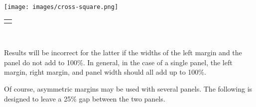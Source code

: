 \documentclass[10pt,]{article}
\theoremstyle{plain}
\theoremstyle{definition}
\theoremstyle{definition}
\theoremstyle{definition}
\theoremstyle{definition}
\theoremstyle{definition}
\theoremstyle{definition}
\numberwithin{equation}{section}
\newlength{\panelmax}
\begin{document}
{%
\setlength{\panelmax}{0pt}
\ifdefined\panelboxAimage\else\newsavebox{\panelboxAimage}\fi%
\begin{lrbox}{\panelboxAimage}
\texttt{[image: images/cross-square.png]}
\end{lrbox}
\ifdefined\phAimage\else\newlength{\phAimage}\fi%
\setlength{\phAimage}{\ht\panelboxAimage+\dp\panelboxAimage}
\settototalheight{\phAimage}{\usebox{\panelboxAimage}}
\setlength{\panelmax}{\maxof{\panelmax}{\phAimage}}
\leavevmode%
\setlength{\tabcolsep}{0\linewidth}
\par\medskip\noindent
\hspace*{0.9\linewidth}%
\begin{tabular}{@{}*{1}{c}@{}}
\begin{minipage}[c][\panelmax][t]{0.1\linewidth}\usebox{\panelboxAimage}\end{minipage}\end{tabular}\\
}%
\par
\hypertarget{p-661}{}%
Results will be incorrect for the latter if the widths of the left margin and the panel do not add to 100\%.  In general, in the case of a single panel, the left margin, right margin, and panel width should all add up to 100\%.%
\par
\hypertarget{p-662}{}%
Of course, asymmetric margins may be used with several panels.  The following is designed to leave a 25\% gap between the two panels.%
\end{document}
